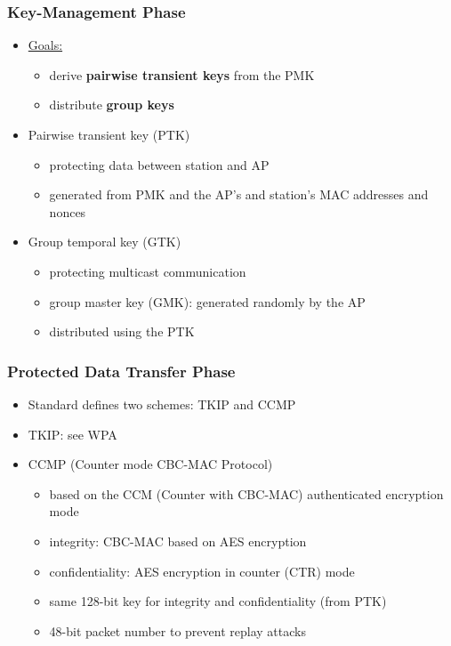 \documentclass[final]{article}
\begin{document}
\subsubsection*{Key-Management Phase}
\begin{itemize}[nosep]
    \item \underline{Goals:}
          \begin{itemize}[nosep]
              \item derive \textbf{pairwise transient keys} from the PMK
              \item distribute \textbf{group keys}
          \end{itemize}
    \item Pairwise transient key (PTK)
          \begin{itemize}[nosep]
              \item protecting data between station and AP
              \item generated from PMK and the AP's and station's MAC addresses and nonces
          \end{itemize}
    \item Group temporal key (GTK)
          \begin{itemize}[nosep]
              \item protecting multicast communication
              \item group master key (GMK): generated randomly by the AP
              \item distributed using the PTK
          \end{itemize}
\end{itemize}
\subsubsection*{Protected Data Transfer Phase}
\begin{itemize}[nosep]
    \item Standard defines two schemes: TKIP and CCMP
    \item TKIP: see WPA
    \item CCMP (Counter mode CBC-MAC Protocol)
          \begin{itemize}[nosep]
              \item based on the CCM (Counter with CBC-MAC) authenticated encryption mode
              \item integrity: CBC-MAC based on AES encryption
              \item confidentiality: AES encryption in counter (CTR) mode
              \item same 128-bit key for integrity and confidentiality (from PTK)
              \item 48-bit packet number to prevent replay attacks
          \end{itemize}
\end{itemize}
\end{document}
